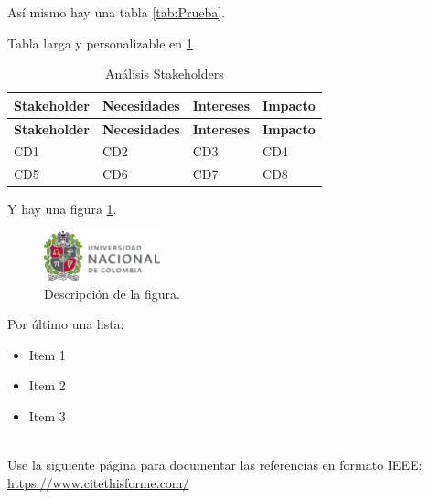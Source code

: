 \documentclass{article}
\begin{document}
Así mismo hay una tabla \ref{tab:Prueba}.

Tabla larga y personalizable en \ref{tab:anaTab}

\renewcommand{\tablename}{Tabla}
\begin{longtable}{|p{3.5cm}|p{3cm}|p{3cm}|p{5cm}|} %
  \caption{Análisis Stakeholders\label{tab:anaTab}} \\
  \hline
  \textbf{Stakeholder} & \textbf{Necesidades} & \textbf{Intereses} & \textbf{Impacto} \\
  \hline
  \endfirsthead %
  \hline
  \textbf{Stakeholder} & \textbf{Necesidades} & \textbf{Intereses} & \textbf{Impacto} \\
  \hline
  \endhead %
  CD1 & CD2 & CD3 & CD4 \\
  \hline
  CD5 & CD6 & CD7 & CD8 \\
  \hline
\end{longtable}


Y hay una figura \ref{fig:ejemplo}.\\

\renewcommand{\figurename}{Figura}
\begin{figure}[htbp]
  \centering
  \includegraphics[width=0.3\textwidth]{logo_universidad.png}
  \caption{Descripción de la figura.}
  \label{fig:ejemplo}
\end{figure}

Por último una lista:

\begin{itemize}
  \item Item 1
  \item Item 2
  \item Item 3\\\\
\end{itemize}


Use la siguiente página para documentar las referencias en formato IEEE: 
\href{https://www.citethisforme.com/}{https://www.citethisforme.com/}
\end{document}
